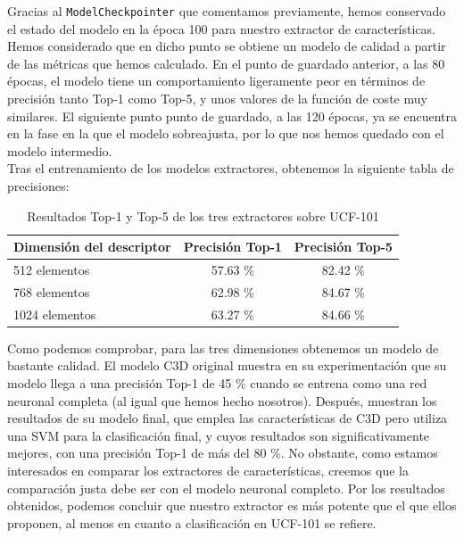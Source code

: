 \documentclass[../main.tex]{memoir}
\begin{document}
Gracias al \texttt{ModelCheckpointer} que comentamos previamente,
hemos conservado el estado del modelo en la época 100 para nuestro
extractor de características. Hemos considerado que en dicho punto se
obtiene un modelo de calidad a partir de las métricas que hemos
calculado. En el punto de guardado anterior, a las 80 épocas, el
modelo tiene un comportamiento ligeramente peor en términos de
precisión tanto Top-1 como Top-5, y unos valores de la función de
coste muy similares. El siguiente punto punto de guardado, a las 120
épocas, ya se encuentra en la fase en la que el modelo sobreajusta,
por lo que nos hemos quedado con el modelo intermedio.\\

Tras el entrenamiento de los modelos extractores, obtenemos la siguiente
tabla de precisiones:

\begin{table}[H]
  \centering
  \begin{tabular}{lcc}
    \toprule
    Dimensión del descriptor & Precisión Top-1 & Precisión Top-5 \\
    \midrule
    512 elementos & 57.63 \% & 82.42 \% \\
    768 elementos & 62.98 \% & 84.67 \% \\
    1024 elementos & 63.27 \% & 84.66 \% \\
    \bottomrule
  \end{tabular}
  \caption{Resultados Top-1 y Top-5 de los tres extractores sobre UCF-101}
  \label{tab:extractor-accs}
\end{table}

Como podemos comprobar, para las tres dimensiones obtenemos un modelo
de bastante calidad. El modelo C3D original muestra en su
experimentación \cite[Figura~2]{tran2015learning} que su modelo llega
a una precisión Top-1 de 45 \% cuando se entrena como una red neuronal
completa (al igual que hemos hecho nosotros). Después, muestran los
resultados de su modelo final, que emplea las características de C3D
pero utiliza una SVM para la clasificación final, y cuyos resultados
son significativamente mejores, con una precisión Top-1 de más del 80
\%. No obstante, como estamos interesados en comparar los extractores
de características, creemos que la comparación justa debe ser con el
modelo neuronal completo. Por los resultados obtenidos, podemos
concluir que nuestro extractor es más potente que el que ellos
proponen, al menos en cuanto a clasificación en UCF-101 se refiere.\\
\end{document}
